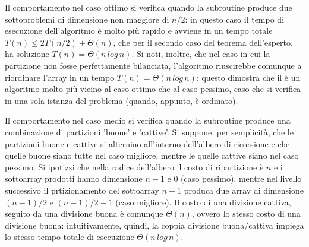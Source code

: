\vspace*{10pt}

Il comportamento nel caso ottimo si verifica quando la subroutine  produce due sottoproblemi di dimensione non maggiore di \(n/2\): in questo caso il tempo di esecuzione dell'algoritmo è molto più rapido e avviene in un tempo totale \(T(n) \le 2T(n/2) + \Theta(n)\), che per il secondo caso del teorema dell'esperto, ha soluzione \(T(n)=\Theta(n\,log\,n)\). Si noti, inoltre, che nel caso in cui la partizione non fosse perfettamente bilanciata, l'algoritmo riuscirebbe comunque a riordinare l'array in un tempo \(T(n)=\Theta(n\,log\,n)\): questo dimostra che il  è un algoritmo molto più vicino al caso ottimo che al caso pessimo, caso che si verifica in una sola istanza del problema (quando, appunto, è ordinato). 

\vspace*{10pt}

Il comportamento nel caso medio si verifica quando la subroutine  produce una combinazione di partizioni 'buone' e 'cattive'. Si suppone, per semplicità, che le partizioni buone e cattive si alternino all'interno dell'albero di ricorsione e che quelle buone siano tutte nel caso migliore, mentre le quelle cattive siano nel caso pessimo. Si ipotizzi che nella radice dell'albero il costo di ripartizione è \(n\) e i sottoarray prodotti hanno dimensione \(n-1\) e 0 (caso pessimo), mentre nel livello successivo il prtizionamento del sottoarray \(n-1\) produca due array di dimensione \((n-1)/2\) e \((n-1)/2 - 1\) (caso migliore). Il costo di una divisione cattiva, seguito da una divisione buona è comunque \(\Theta(n)\), ovvero lo stesso costo di una divisione buona: intuitivamente, quindi, la coppia divisione buona/cattiva impiega lo stesso tempo totale di esecuzione \(\Theta(n\,log\,n)\).

